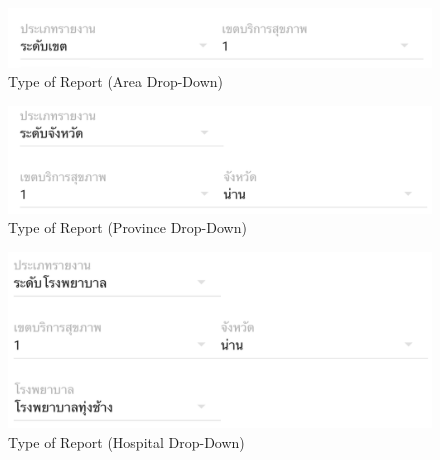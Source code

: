     \FloatBarrier
        \begin{figure}[h!]
            \centering
        		\includegraphics[width=\linewidth]{images/chapter-06/type-of-report-area.png}
            	\caption{Type of Report (Area Drop-Down)}
        		\label{figure-type-of-report-area}
        \end{figure}
    \FloatBarrier
    
    \FloatBarrier
        \begin{figure}[h!]
            \centering
        		\includegraphics[width=\linewidth]{images/chapter-06/type-of-report-province.png}
            	\caption{Type of Report (Province Drop-Down)}
        		\label{figure-type-of-report-province}
        \end{figure}
    \FloatBarrier
    
    \FloatBarrier
        \begin{figure}[h!]
            \centering
        		\includegraphics[width=\linewidth]{images/chapter-06/type-of-report-hospital.png}
            	\caption{Type of Report (Hospital Drop-Down)}
        		\label{figure-type-of-report-hospital}
        \end{figure}
    \FloatBarrier



